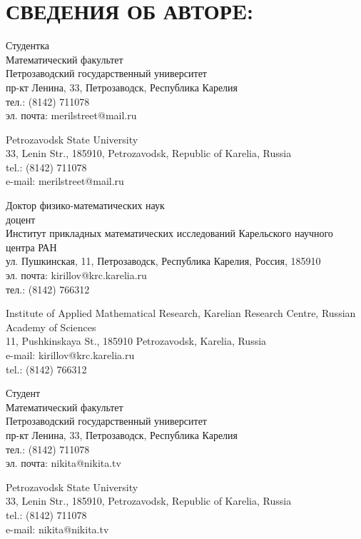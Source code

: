\documentclass{article}
\begin{document}
\section{СВЕДЕНИЯ ОБ АВТОРE:}

\begin{aboutauthors}
Студентка\\
Математический факультет\\ 
Петрозаводский государственный университет\\
пр-кт Ленина, 33, Петрозаводск, Республика Карелия\\
тел.: (8142) 711078\\
эл. почта: merilstreet@mail.ru

\columnbreak

Petrozavodsk State University\\
33, Lenin Str., 185910, Petrozavodsk, Republic of Karelia, Russia\\
tel.: (8142) 711078\\
e-mail: merilstreet@mail.ru
\end{aboutauthors}

\begin{aboutauthors}
Доктор физико-математических наук\\ 
доцент\\
Институт прикладных математических исследований Карельского научного центра РАН\\ 
ул. Пушкинская, 11, Петрозаводск, Республика Карелия, Россия, 185910\\
эл. почта: kirillov@krc.karelia.ru\\
тел.: (8142) 766312

\columnbreak

Institute of Applied Mathematical Research, Karelian Research Centre, Russian Academy of Sciences\\
11, Pushkinskaya St., 185910 Petrozavodsk, Karelia, Russia\\
e-mail: kirillov@krc.karelia.ru\\
tel.: (8142) 766312
\end{aboutauthors}

\begin{aboutauthors}
Студент\\
Математический факультет\\ 
Петрозаводский государственный университет\\
пр-кт Ленина, 33, Петрозаводск, Республика Карелия\\
тел.: (8142) 711078\\
эл. почта: nikita@nikita.tv

\columnbreak

Petrozavodsk State University\\
33, Lenin Str., 185910, Petrozavodsk, Republic of Karelia, Russia\\
tel.: (8142) 711078\\
e-mail: nikita@nikita.tv 
\end{aboutauthors}
\end{document}
